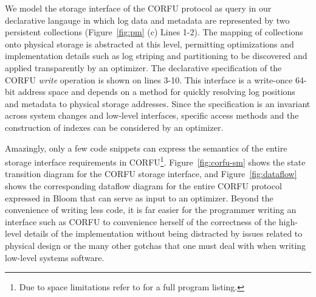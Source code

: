 We model the storage interface of the CORFU protocol as query in our
declarative langauge in which log data and metadata are represented by two
persistent collections (Figure~\ref{fig:pm} (c) Lines 1-2).  The mapping of
collections onto physical storage is abstracted at this level, permitting
optimizations and implementation details such as log striping and partitioning
to be discovered and applied transparently by an optimizer.  The declarative
specification of the CORFU \emph{write} operation is shown on lines 3-10.
This interface is a write-once 64-bit address space and depends on a method
for quickly resolving log positions and metadata to physical storage
addresses.  Since the specification is an invariant across system changes and
low-level interfaces, specific access methods and the construction of indexes
can be considered by an optimizer.

Amazingly, only a few code snippets can express the semantics of the entire
storage interface requirements in CORFU\footnote{Due to space limitations
refer to \cite{watkins:ucsc-soe-16-12} for a full program listing.}.
Figure~\ref{fig:corfu-sm} shows the state transition diagram for the CORFU
storage interface, and Figure~\ref{fig:dataflow} shows the corresponding
dataflow diagram for the entire CORFU protocol expressed in Bloom that can
serve as input to an optimizer.  Beyond the convenience of writing less code,
it is far easier for the programmer writing an interface such as CORFU to
convenience herself of the correctness of the high-level details of the
implementation without being distracted by issues related to physical design
or the many other gotchas that one must deal with when writing low-level
systems software.




